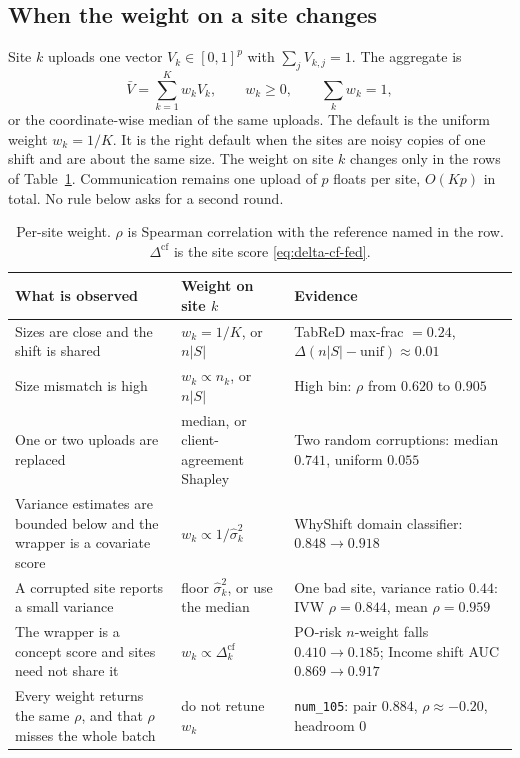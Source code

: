 \subsection{When the weight on a site changes}
\label{sec:when-weight}

Site \(k\) uploads one vector \(V_k\in[0,1]^p\) with
\(\sum_j V_{k,j}=1\).
The aggregate is
\begin{equation}
\label{eq:agg-weight}
\bar V=\sum_{k=1}^{K} w_k V_k,
\qquad w_k\ge 0,
\qquad \sum_k w_k=1,
\end{equation}
or the coordinate-wise median of the same uploads.
The default is the uniform weight \(w_k=1/K\).
It is the right default when the sites are noisy copies of one shift and
are about the same size.
The weight on site \(k\) changes only in the rows of
Table~\ref{tab:weight-rule}.
Communication remains one upload of \(p\) floats per site, \(O(Kp)\) in
total.
No rule below asks for a second round.

\begin{table}[t]
\centering
\small
\caption{Per-site weight. \(\rho\) is Spearman correlation with the
reference named in the row. \(\Delta^{\mathrm{cf}}\) is the site score
\eqref{eq:delta-cf-fed}.}
\label{tab:weight-rule}
\begin{tabular}{p{}p{}p{}}
\toprule
What is observed & Weight on site \(k\) & Evidence \\
\midrule
Sizes are close and the shift is shared & \(w_k=1/K\), or \(n|S|\) & TabReD max-frac \(=0.24\), \(\Delta(n|S|-\mathrm{unif})\approx 0.01\) \\
Size mismatch is high & \(w_k\propto n_k\), or \(n|S|\) & High bin: \(\rho\) from \(0.620\) to \(0.905\) \\
One or two uploads are replaced & median, or client-agreement Shapley & Two random corruptions: median \(0.741\), uniform \(0.055\) \\
Variance estimates are bounded below and the wrapper is a covariate score & \(w_k\propto 1/\hat\sigma_k^2\) & WhyShift domain classifier: \(0.848\to 0.918\) \\
A corrupted site reports a small variance & floor \(\hat\sigma_k^2\), or use the median & One bad site, variance ratio \(0.44\): IVW \(\rho=0.844\), mean \(\rho=0.959\) \\
The wrapper is a concept score and sites need not share it & \(w_k\propto\Delta^{\mathrm{cf}}_k\) & PO-risk \(n\)-weight falls \(0.410\to 0.185\); Income shift AUC \(0.869\to 0.917\) \\
Every weight returns the same \(\rho\), and that \(\rho\) misses the whole batch & do not retune \(w_k\) & \texttt{num\_105}: pair \(0.884\), \(\rho\approx -0.20\), headroom \(0\) \\
\bottomrule
\end{tabular}
\end{table}

